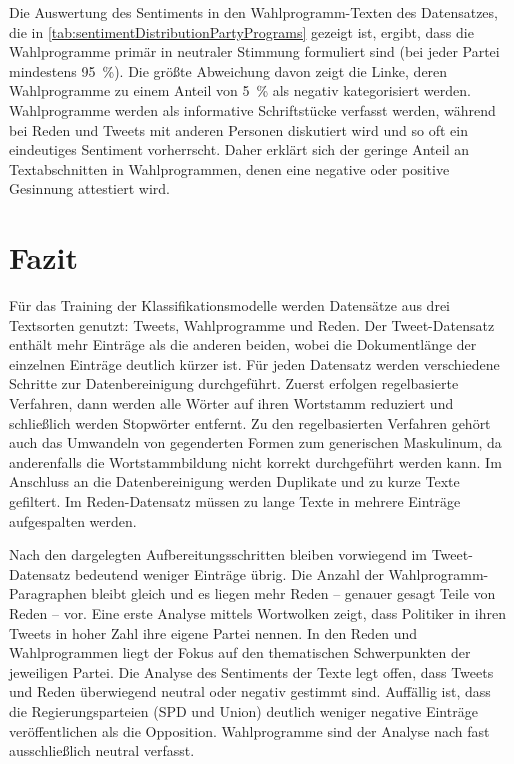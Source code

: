 Die Auswertung des Sentiments in den Wahlprogramm-Texten des Datensatzes, die in \autoref{tab:sentimentDistributionPartyPrograms} gezeigt ist, ergibt, dass die Wahlprogramme primär in neutraler Stimmung formuliert sind (bei jeder Partei mindestens \SI{95}{\percent}). Die größte Abweichung davon zeigt die Linke, deren Wahlprogramme zu einem Anteil von \SI{5}{\percent} als negativ kategorisiert werden. Wahlprogramme werden als informative Schriftstücke verfasst werden, während bei Reden und Tweets mit anderen Personen diskutiert wird und so oft ein eindeutiges Sentiment vorherrscht. Daher erklärt sich der geringe Anteil an Textabschnitten in Wahlprogrammen, denen eine negative oder positive Gesinnung attestiert wird.

\section{Fazit} \label{sec:crispConclusion_1}

Für das Training der Klassifikationsmodelle werden Datensätze aus drei Textsorten genutzt: Tweets, Wahlprogramme und Reden. Der Tweet-Datensatz enthält mehr Einträge als die anderen beiden, wobei die Dokumentlänge der einzelnen Einträge deutlich kürzer ist. Für jeden Datensatz werden verschiedene Schritte zur Datenbereinigung durchgeführt. Zuerst erfolgen regelbasierte Verfahren, dann werden alle Wörter auf ihren Wortstamm reduziert und schließlich werden Stopwörter entfernt. Zu den regelbasierten Verfahren gehört auch das Umwandeln von gegenderten Formen zum generischen Maskulinum, da anderenfalls die Wortstammbildung nicht korrekt durchgeführt werden kann. Im Anschluss an die Datenbereinigung werden Duplikate und zu kurze Texte gefiltert. Im Reden-Datensatz müssen zu lange Texte in mehrere Einträge aufgespalten werden.

Nach den dargelegten Aufbereitungsschritten bleiben vorwiegend im Tweet-Datensatz bedeutend weniger Einträge übrig. Die Anzahl der Wahlprogramm-Paragraphen bleibt gleich und es liegen mehr Reden -- genauer gesagt Teile von Reden -- vor. Eine erste Analyse mittels Wortwolken zeigt, dass Politiker in ihren Tweets in hoher Zahl ihre eigene Partei nennen. In den Reden und Wahlprogrammen liegt der Fokus auf den thematischen Schwerpunkten der jeweiligen Partei. Die Analyse des Sentiments der Texte legt offen, dass Tweets und Reden überwiegend neutral oder negativ gestimmt sind. Auffällig ist, dass die Regierungsparteien (\ac{SPD} und Union) deutlich weniger negative Einträge veröffentlichen als die Opposition. Wahlprogramme sind der Analyse nach fast ausschließlich neutral verfasst.